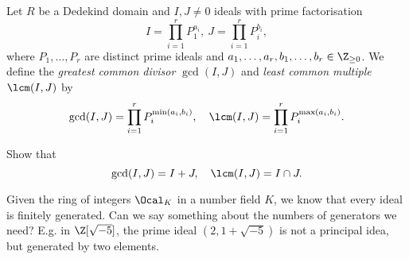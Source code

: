 \begin{defn*}
	Let \( R \) be a Dedekind domain and \( I, J \neq 0 \) ideals with prime factorisation
	\[ I = \prod_{i=1}^r P_1^{a_i},\ J = \prod_{i=1}^r P_i^{b_i}, \]
	where \( P_1, \dotsc, P_r \) are distinct prime ideals and \( a_1, \dotsc, a_r, b_1, \dotsc, b_r \in \Z_{\geq 0} \).
	We define the \emph{greatest common divisor} \( \gcd(I,J) \) and \emph{least common multiple} \( \lcm(I,J) \) by
	\[ \gcd(I,J) = \prod_{i=1}^r P_i^{\min(a_i,b_i)},\quad \lcm(I,J) = \prod_{i=1}^r P_i^{\max(a_i,b_i)}. \]
\end{defn*}

\begin{exc*}
	Show that
	\[ \gcd(I,J) = I + J,\quad \lcm(I,J) = I \cap J. \]
\end{exc*}

\begin{frage*}
	Given the ring of integers \( \Ocal_K \) in a number field \( K \), we know that every ideal is finitely generated.
	Can we say something about the numbers of generators we need?
	E.g. in \( \Z[\sqrt{-5}] \), the prime ideal \( (2, 1+\sqrt{-5}) \) is not a principal idea, but generated by two elements.
\end{frage*}